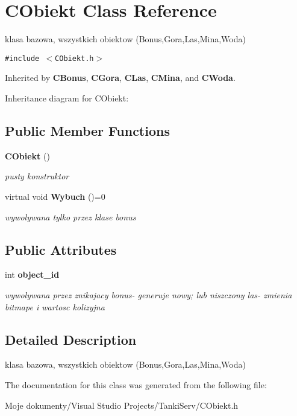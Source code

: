 \section{CObiekt Class Reference}
\label{class_c_obiekt}
klasa bazowa, wszystkich obiektow (Bonus,Gora,Las,Mina,Woda)  


{\tt \#include $<$CObiekt.h$>$}

Inherited by {\bf CBonus}, {\bf CGora}, {\bf CLas}, {\bf CMina}, and {\bf CWoda}.

Inheritance diagram for CObiekt:\subsection*{Public Member Functions}
\begin{CompactItemize}
\item 
{\bf CObiekt} ()\label{class_c_obiekt_a1a5183f5ee5e56c066679fb37576627}

\begin{CompactList}\small\item\em pusty konstruktor \item\end{CompactList}\item 
virtual void {\bf Wybuch} ()=0\label{class_c_obiekt_8200c1db0c361426ef7377d598965536}

\begin{CompactList}\small\item\em wywolywana tylko przez klase bonus \item\end{CompactList}\end{CompactItemize}
\subsection*{Public Attributes}
\begin{CompactItemize}
\item 
int {\bf object\_\-id}\label{class_c_obiekt_fdac94d71b407802e174aaeb82ea0618}

\begin{CompactList}\small\item\em wywolywana przez znikajacy bonus- generuje nowy; lub niszczony las- zmienia bitmape i wartosc kolizyjna \item\end{CompactList}\end{CompactItemize}


\subsection{Detailed Description}
klasa bazowa, wszystkich obiektow (Bonus,Gora,Las,Mina,Woda) 



The documentation for this class was generated from the following file:\begin{CompactItemize}
\item 
Moje dokumenty/Visual Studio Projects/TankiServ/CObiekt.h\end{CompactItemize}
